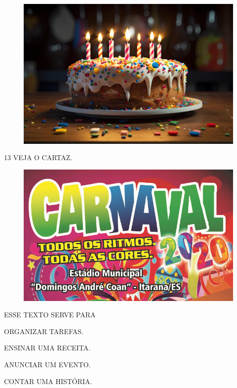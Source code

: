 \begin{figure}[H]
\includegraphics[width=\textwidth]{media/image269.png}
\end{figure}

\num{13} VEJA O CARTAZ.

\begin{figure}[H]
\centering
\includegraphics[width=.9\textwidth]{media/image204.png}
\end{figure}

ESSE TEXTO SERVE PARA

\begin{escolha}[itemsep=-5pt]
\item ORGANIZAR TAREFAS.

\item ENSINAR UMA RECEITA.

\item ANUNCIAR UM EVENTO.

\item CONTAR UMA HISTÓRIA.
\end{escolha}

